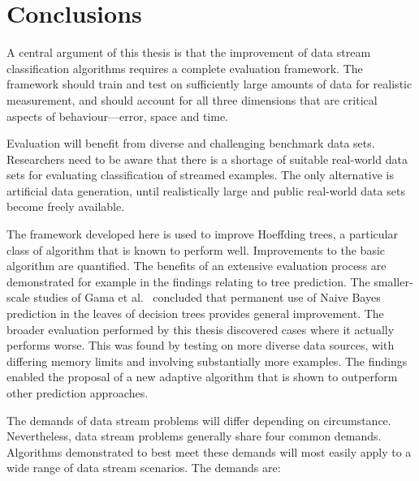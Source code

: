 \chapter{Conclusions}
\label{chap:conclusions} 

A central argument of this thesis is that the improvement of
data stream classification algorithms requires a complete evaluation framework. The framework should train and test on sufficiently large amounts of data for realistic measurement, and should account for all three dimensions that are critical aspects of behaviour---error, space and time.

Evaluation will benefit from diverse and challenging benchmark data sets. Researchers need to be aware that there is a shortage of suitable real-world data sets for evaluating classification of streamed examples. The only alternative is artificial data generation, until realistically large and public real-world data sets become freely available.

The framework developed here is used to improve Hoeffding trees, a particular class of algorithm that is known to perform well. Improvements to the basic algorithm are quantified. The benefits of an extensive evaluation process are demonstrated for example in the findings relating to tree prediction. The smaller-scale studies of Gama et al.~\cite{ufft,vfdtc} concluded that permanent use of Naive Bayes prediction in the leaves of decision trees provides general improvement. The broader evaluation performed by this thesis discovered cases where it actually performs worse. This was found by testing on more diverse data sources, with differing memory limits and involving substantially more examples. The findings enabled the proposal of a new adaptive algorithm that is shown to outperform other prediction approaches.

The demands of data stream problems will differ depending on circumstance.
Nevertheless, data stream problems generally share four common demands. Algorithms demonstrated to best meet these demands will most easily apply to a wide range of data stream scenarios. The demands are:

